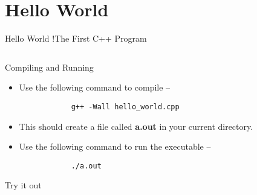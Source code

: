 \section{Hello World}

\begin{frame}{Hello World !}{The First C++ Program}
  \inputminted{c++}{../code/hello_world/hello_world.cpp}
\end{frame}

\begin{frame}[fragile]{Compiling and Running}
  \begin{itemize}
      \item Use the following command to compile --
        \begin{verbatim}
            g++ -Wall hello_world.cpp
        \end{verbatim}
      \item This should create a file called \textbf{a.out} in your current directory.
      \item Use the following command to run the executable --
        \begin{verbatim}
            ./a.out
        \end{verbatim}
  \end{itemize}
\end{frame}

\begin{frame}{Try it out}{}
\end{frame}
